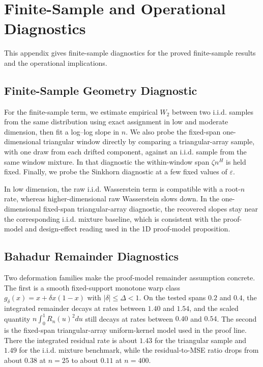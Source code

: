 \section{Finite-Sample and Operational Diagnostics}\label{app:finite_sample_geometry}

This appendix gives finite-sample diagnostics for the proved finite-sample
results and the operational implications.

\subsection{Finite-Sample Geometry Diagnostic}

For the finite-sample term, we estimate empirical $W_2$ between two i.i.d.
samples from the same distribution using exact assignment in low and moderate
dimension, then fit a log--log slope in $n$. We also probe the fixed-span
one-dimensional triangular window directly by comparing a triangular-array
sample, with one draw from each drifted component, against an i.i.d. sample from
the same window mixture. In that diagnostic the within-window span $\zeta n^H$ is
held fixed. Finally, we probe the Sinkhorn diagnostic at a few fixed values of
$\varepsilon$.



In low dimension, the raw i.i.d. Wasserstein term is compatible with a root-$n$
rate, whereas higher-dimensional raw Wasserstein slows down. In the
one-dimensional fixed-span triangular-array diagnostic, the recovered slopes stay
near the corresponding i.i.d. mixture baseline, which is consistent with the
proof-model and design-effect reading used in the 1D proof-model proposition.

\subsection{Bahadur Remainder Diagnostics}

Two deformation families make the proof-model remainder assumption concrete. The
first is a smooth fixed-support monotone warp class
$g_\delta(x)=x+\delta x(1-x)$ with $|\delta|\le \Delta<1$. On the tested spans
$0.2$ and $0.4$, the integrated remainder decays at rates between $1.40$ and
$1.54$, and the scaled quantity $n\int_0^1 R_n(u)^2du$ still decays at rates
between $0.40$ and $0.54$. The second is the fixed-span triangular-array
uniform-kernel model used in the proof line. There the integrated residual rate
is about $1.43$ for the triangular sample and $1.49$ for the i.i.d. mixture
benchmark, while the residual-to-MSE ratio drops from about $0.38$ at $n=25$ to
about $0.11$ at $n=400$.

